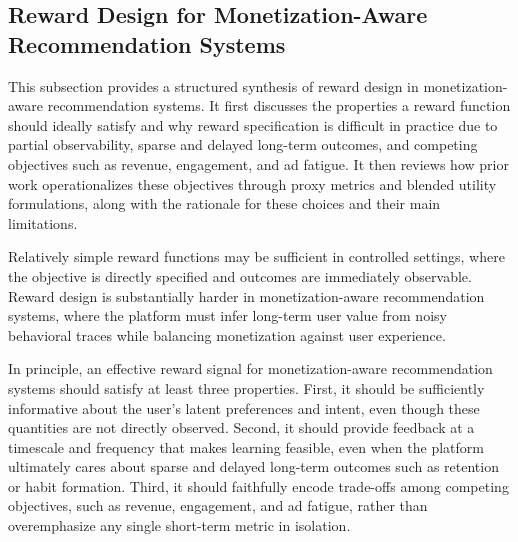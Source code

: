\documentclass[manuscript,review,screen]{acmart}
\begin{document}
\subsection{Reward Design for Monetization-Aware Recommendation Systems}
\label{subsec:reward-design}

This subsection provides a structured synthesis of reward design in monetization-aware recommendation systems. It first discusses the properties a reward function should ideally satisfy and why reward specification is difficult in practice due to partial observability, sparse and delayed long-term outcomes, and competing objectives such as revenue, engagement, and ad fatigue. It then reviews how prior work operationalizes these objectives through proxy metrics and blended utility formulations, along with the rationale for these choices and their main limitations.

Relatively simple reward functions may be sufficient in controlled settings, where the objective is directly specified and outcomes are immediately observable. Reward design is substantially harder in monetization-aware recommendation systems, where the platform must infer long-term user value from noisy behavioral traces while balancing monetization against user experience.

In principle, an effective reward signal for monetization-aware recommendation systems should satisfy at least three properties. First, it should be sufficiently informative about the user’s latent preferences and intent, even though these quantities are not directly observed. Second, it should provide feedback at a timescale and frequency that makes learning feasible, even when the platform ultimately cares about sparse and delayed long-term outcomes such as retention or habit formation. Third, it should faithfully encode trade-offs among competing objectives, such as revenue, engagement, and ad fatigue, rather than overemphasize any single short-term metric in isolation.
\end{document}

